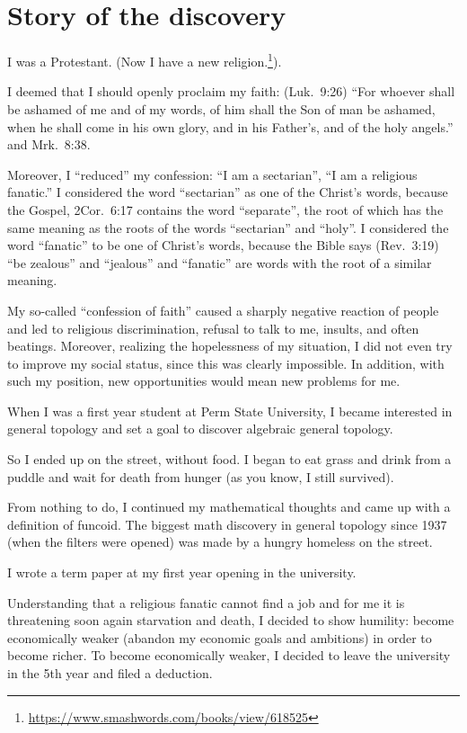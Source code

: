 \chapter{Story of the discovery}

I was a Protestant. (Now I have a new religion.\footnote{\url{https://www.smashwords.com/books/view/618525}}).

I deemed that I should openly proclaim my faith: (Luk.~9:26) ``For whoever shall be ashamed of me and of my words, of him shall the Son of man be ashamed, when he shall come in his own glory, and in his Father's, and of the holy angels.'' and Mrk.~8:38.

Moreover, I ``reduced'' my confession: ``I am a sectarian'', ``I am a religious fanatic.'' I considered the word ``sectarian'' as one of the Christ's words, because the Gospel, 2Cor.~6:17 contains the word ``separate'', the root of which has the same meaning as the roots of the words ``sectarian'' and ``holy''. I considered the word ``fanatic'' to be one of Christ's words, because the Bible says (Rev.~3:19) ``be zealous'' and ``jealous'' and ``fanatic'' are words with the root of a similar meaning.

My so-called ``confession of faith'' caused a sharply negative reaction of people and led to religious discrimination, refusal to talk to me, insults, and often beatings.
Moreover, realizing the hopelessness of my situation, I did not even try to improve my social status, since this was clearly impossible. In addition, with such my position, new opportunities would mean new problems for me.

When I was a first year student at Perm State University, I became interested in general topology and set a goal to discover algebraic general topology.

So I ended up on the street, without food. I began to eat grass and
drink from a puddle and wait for death from hunger (as you know, I still
survived).

From nothing to do, I continued my mathematical thoughts and
came up with a definition of funcoid. The biggest math
discovery in general topology since 1937 (when the filters were opened)
was made by a hungry homeless on the street.

I wrote a term paper at my first year opening in the university.

Understanding that a religious fanatic cannot find a job and for me it is threatening soon
again starvation and death, I decided to show humility:
become economically weaker (abandon my economic
goals and ambitions) in order to become richer. To become
economically weaker, I decided to leave the university in the 5th year
and filed a deduction.

